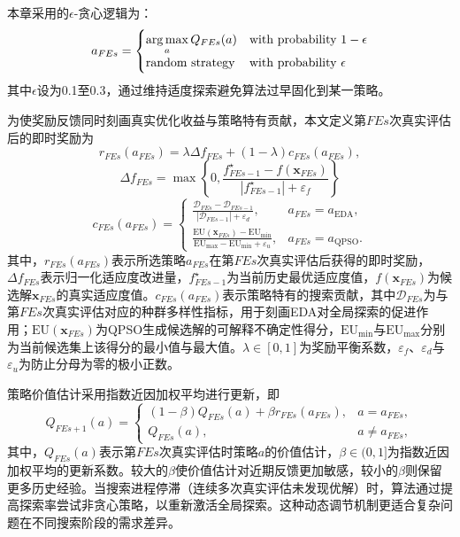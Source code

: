 本章采用的$\epsilon$-贪心逻辑为：
\begin{equation}
a_{FEs} =
\begin{cases}
\operatorname*{arg\,max}\limits_a Q_{FEs}(a) & \text{with probability } 1-\epsilon \\
\text{random strategy} & \text{with probability } \epsilon
\end{cases}
\end{equation}
其中$\epsilon$设为0.1至0.3，通过维持适度探索避免算法过早固化到某一策略。

为使奖励反馈同时刻画真实优化收益与策略特有贡献，本文定义第$FEs$次真实评估后的即时奖励为
\begin{equation}
r_{FEs}(a_{FEs}) = \lambda \Delta f_{FEs} + (1-\lambda)c_{FEs}(a_{FEs}),
\end{equation}
\begin{equation}
\Delta f_{FEs} = \max\left\{0,\frac{f^\star_{FEs-1}-f(\mathbf{x}_{FEs})}{\left|f^\star_{FEs-1}\right|+\varepsilon_f}\right\}
\end{equation}
\begin{equation}
c_{FEs}(a_{FEs}) =
\begin{cases}
\displaystyle \frac{\mathcal{D}_{FEs}-\mathcal{D}_{FEs-1}}{\left|\mathcal{D}_{FEs-1}\right|+\varepsilon_d}, & a_{FEs}=a_{\mathrm{EDA}}, \\[10pt]
\displaystyle \frac{\mathrm{EU}(\mathbf{x}_{FEs})-\mathrm{EU}_{\min}}{\mathrm{EU}_{\max}-\mathrm{EU}_{\min}+\varepsilon_u}, & a_{FEs}=a_{\mathrm{QPSO}}.
\end{cases}
\end{equation}
其中，$r_{FEs}(a_{FEs})$表示所选策略$a_{FEs}$在第$FEs$次真实评估后获得的即时奖励，$\Delta f_{FEs}$表示归一化适应度改进量，$f^\star_{FEs-1}$为当前历史最优适应度值，$f(\mathbf{x}_{FEs})$为候选解$\mathbf{x}_{FEs}$的真实适应度值。$c_{FEs}(a_{FEs})$表示策略特有的搜索贡献，其中$\mathcal{D}_{FEs}$为与第$FEs$次真实评估对应的种群多样性指标，用于刻画EDA对全局探索的促进作用；$\mathrm{EU}(\mathbf{x}_{FEs})$为QPSO生成候选解的可解释不确定性得分，$\mathrm{EU}_{\min}$与$\mathrm{EU}_{\max}$分别为当前候选集上该得分的最小值与最大值。$\lambda \in [0,1]$为奖励平衡系数，$\varepsilon_f$、$\varepsilon_d$与$\varepsilon_u$为防止分母为零的极小正数。

策略价值估计采用指数近因加权平均进行更新，即
\begin{equation}
Q_{FEs+1}(a)=
\begin{cases}
(1-\beta)Q_{FEs}(a) + \beta r_{FEs}(a_{FEs}), & a=a_{FEs}, \\
Q_{FEs}(a), & a \neq a_{FEs},
\end{cases}
\end{equation}
其中，$Q_{FEs}(a)$表示第$FEs$次真实评估时策略$a$的价值估计，$\beta \in (0,1]$为指数近因加权平均的更新系数。较大的$\beta$使价值估计对近期反馈更加敏感，较小的$\beta$则保留更多历史经验。当搜索进程停滞（连续多次真实评估未发现优解）时，算法通过提高探索率尝试非贪心策略，以重新激活全局探索。这种动态调节机制更适合复杂问题在不同搜索阶段的需求差异。

